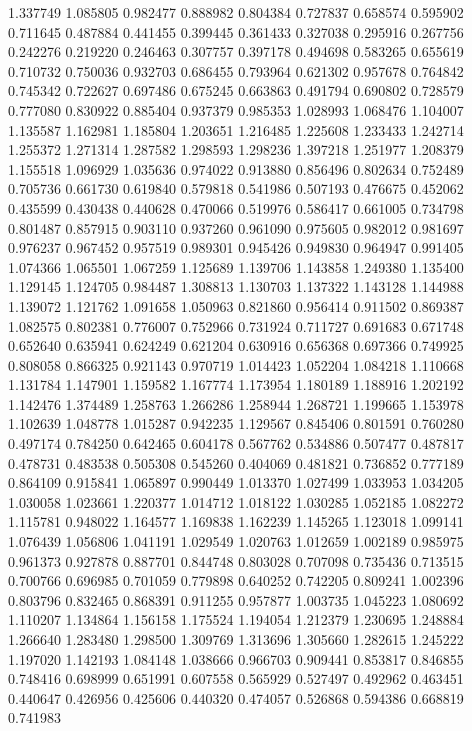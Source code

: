1.337749
1.085805
0.982477
0.888982
0.804384
0.727837
0.658574
0.595902
0.711645
0.487884
0.441455
0.399445
0.361433
0.327038
0.295916
0.267756
0.242276
0.219220
0.246463
0.307757
0.397178
0.494698
0.583265
0.655619
0.710732
0.750036
0.932703
0.686455
0.793964
0.621302
0.957678
0.764842
0.745342
0.722627
0.697486
0.675245
0.663863
0.491794
0.690802
0.728579
0.777080
0.830922
0.885404
0.937379
0.985353
1.028993
1.068476
1.104007
1.135587
1.162981
1.185804
1.203651
1.216485
1.225608
1.233433
1.242714
1.255372
1.271314
1.287582
1.298593
1.298236
1.397218
1.251977
1.208379
1.155518
1.096929
1.035636
0.974022
0.913880
0.856496
0.802634
0.752489
0.705736
0.661730
0.619840
0.579818
0.541986
0.507193
0.476675
0.452062
0.435599
0.430438
0.440628
0.470066
0.519976
0.586417
0.661005
0.734798
0.801487
0.857915
0.903110
0.937260
0.961090
0.975605
0.982012
0.981697
0.976237
0.967452
0.957519
0.989301
0.945426
0.949830
0.964947
0.991405
1.074366
1.065501
1.067259
1.125689
1.139706
1.143858
1.249380
1.135400
1.129145
1.124705
0.984487
1.308813
1.130703
1.137322
1.143128
1.144988
1.139072
1.121762
1.091658
1.050963
0.821860
0.956414
0.911502
0.869387
1.082575
0.802381
0.776007
0.752966
0.731924
0.711727
0.691683
0.671748
0.652640
0.635941
0.624249
0.621204
0.630916
0.656368
0.697366
0.749925
0.808058
0.866325
0.921143
0.970719
1.014423
1.052204
1.084218
1.110668
1.131784
1.147901
1.159582
1.167774
1.173954
1.180189
1.188916
1.202192
1.142476
1.374489
1.258763
1.266286
1.258944
1.268721
1.199665
1.153978
1.102639
1.048778
1.015287
0.942235
1.129567
0.845406
0.801591
0.760280
0.497174
0.784250
0.642465
0.604178
0.567762
0.534886
0.507477
0.487817
0.478731
0.483538
0.505308
0.545260
0.404069
0.481821
0.736852
0.777189
0.864109
0.915841
1.065897
0.990449
1.013370
1.027499
1.033953
1.034205
1.030058
1.023661
1.220377
1.014712
1.018122
1.030285
1.052185
1.082272
1.115781
0.948022
1.164577
1.169838
1.162239
1.145265
1.123018
1.099141
1.076439
1.056806
1.041191
1.029549
1.020763
1.012659
1.002189
0.985975
0.961373
0.927878
0.887701
0.844748
0.803028
0.707098
0.735436
0.713515
0.700766
0.696985
0.701059
0.779898
0.640252
0.742205
0.809241
1.002396
0.803796
0.832465
0.868391
0.911255
0.957877
1.003735
1.045223
1.080692
1.110207
1.134864
1.156158
1.175524
1.194054
1.212379
1.230695
1.248884
1.266640
1.283480
1.298500
1.309769
1.313696
1.305660
1.282615
1.245222
1.197020
1.142193
1.084148
1.038666
0.966703
0.909441
0.853817
0.846855
0.748416
0.698999
0.651991
0.607558
0.565929
0.527497
0.492962
0.463451
0.440647
0.426956
0.425606
0.440320
0.474057
0.526868
0.594386
0.668819
0.741983
